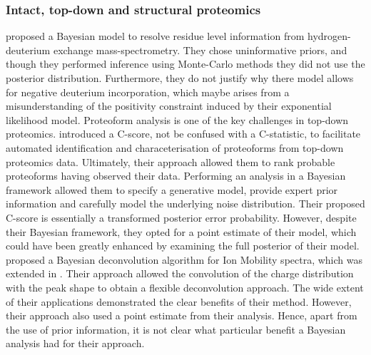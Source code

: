 \documentclass[12pt,english, journal=jpr, layout=twocolumn]{article}
\begin{document}
\subsubsection{Intact, top-down and structural proteomics}
 \citet{Saltzberg::2017} proposed a Bayesian model to resolve residue level information from hydrogen-deuterium exchange mass-spectrometry. They chose uninformative priors, and though they performed inference using Monte-Carlo methods they did not use the posterior distribution. Furthermore, they do not justify why there model allows for negative deuterium incorporation, which maybe arises from a misunderstanding of the positivity constraint induced by their exponential likelihood model. Proteoform analysis is one of the key challenges in top-down proteomics. \citet{Leduc::2014} introduced a C-score, not be confused with a C-statistic, to facilitate automated identification and characeterisation of proteoforms from top-down proteomics data. Ultimately, their approach allowed them to rank probable proteoforms having observed their data. Performing an analysis in a Bayesian framework allowed them to specify a generative model, provide expert prior information and carefully model the underlying noise distribution. Their proposed C-score is essentially a transformed posterior error probability. However, despite their Bayesian framework, they opted for a point estimate of their model, which could have been greatly enhanced by examining the full posterior of their model. \citet{Marty::2015} proposed a Bayesian deconvolution algorithm for Ion Mobility spectra, which was extended in \citet{Kostelic::2021}. Their approach allowed the convolution of the charge distribution with the peak shape to obtain a flexible deconvolution approach. The wide extent of their applications demonstrated the clear benefits of their method. However, their approach also used a point estimate from their analysis. Hence, apart from the use of prior information, it is not clear what particular benefit a Bayesian analysis had for their approach.
\end{document}
